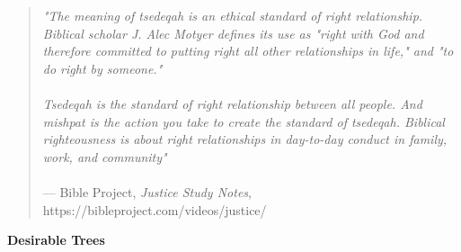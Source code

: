 \documentclass[11pt]{article}
\begin{document}
\begin{quote}
\textit{"The meaning of tsedeqah is an ethical standard of right relationship. Biblical scholar J. Alec
Motyer defines its use as "right with God and therefore committed to putting right all other relationships in life," and "to do right by someone."
\\\\Tsedeqah is the standard of right relationship between all people. And mishpat is the action you
take to create the standard of tsedeqah. Biblical righteousness is about right relationships in
day-to-day conduct in family, work, and community"}\\\\
\hfill --- Bible Project, \textit{Justice Study Notes}, https://bibleproject.com/videos/justice/
\end{quote}

\begin{chiasticoutline}[Isaiah 1:27-31]{.25em}{2em}





\end{chiasticoutline}

{\vspace{2em}}
{\large\bfseries Desirable Trees}
{\vspace{1em}}
\end{document}
